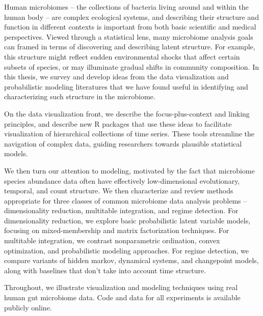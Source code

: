 
Human microbiomes -- the collections of bacteria living around and within the
human body -- are complex ecological systems, and describing their structure and
function in different contexts is important from both basic scientific and
medical perspectives. Viewed through a statistical lens, many microbiome
analysis goals can framed in terms of discovering and describing latent
structure. For example, this structure might reflect sudden environmental shocks
that affect certain subsets of species, or may illuminate gradual shifts in
community composition. In this thesis, we survey and develop ideas from the data
visualization and probabilistic modeling literatures that we have found useful
in identifying and characterizing such structure in the microbiome.

On the data visualization front, we describe the focus-plus-context and linking
principles, and describe new R packages that use these ideas to facilitate
visualization of hierarchical collections of time series. These tools streamline
the navigation of complex data, guiding researchers towards plausible
statistical models.

We then turn our attention to modeling, motivated by the fact that microbiome
species abundance data often have effectively low-dimensional evolutionary,
temporal, and count structure. We then characterize and review methods
appropriate for three classes of common microbiome data analysis problems --
dimensionality reduction, multitable integration, and regime detection. For
dimensionality reduction, we explore basic probabilistic latent variable models,
focusing on mixed-membership and matrix factorization techniques. For multitable
integration, we contrast nonparametric ordination, convex optimization, and
probabilistic modeling approaches. For regime detection, we compare variants of
hidden markov, dynamical systems, and changepoint models, along with baselines
that don't take into account time structure.

Throughout, we illustrate visualization and modeling techniques using real human
gut microbiome data. Code and data for all experiments is available publicly
online.
